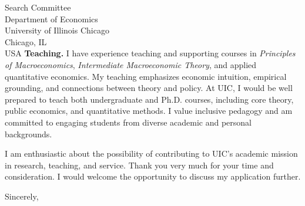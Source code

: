 \documentclass[11pt,letterpaper]{letter}
\begin{document}
\begin{letter}{Search Committee \\
Department of Economics \\
University of Illinois Chicago \\
Chicago, IL \\ USA}
\textbf{Teaching.} I have experience teaching and supporting courses in \textit{Principles of Macroeconomics}, \textit{Intermediate Macroeconomic Theory}, and applied quantitative economics. My teaching emphasizes economic intuition, empirical grounding, and connections between theory and policy. At UIC, I would be well prepared to teach both undergraduate and Ph.D. courses, including core theory, public economics, and quantitative methods. I value inclusive pedagogy and am committed to engaging students from diverse academic and personal backgrounds.

I am enthusiastic about the possibility of contributing to UIC’s academic mission in research, teaching, and service. Thank you very much for your time and consideration. I would welcome the opportunity to discuss my application further.

\closing{Sincerely,}

\end{letter}
\end{document}
